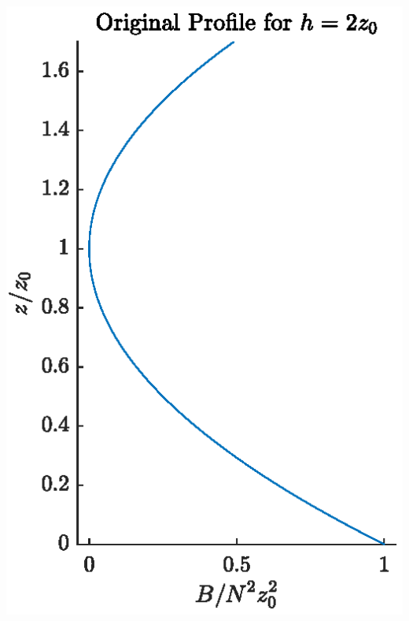 \documentclass[11pt,letterpaper]{book}
\theoremstyle{definition}
\begin{document}
\begin{center}
\includegraphics[scale=1]{Fig/hll2z0_org}\;\;

\end{center}
\end{document}

